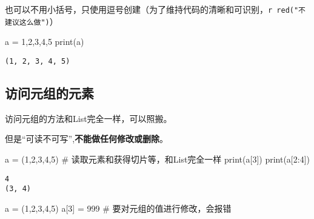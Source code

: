 \documentclass[
  letterpaper,
  DIV=11,
  numbers=noendperiod]{scrreprt}
\newenvironment{Shaded}{\begin{snugshade}}{\end{snugshade}}
\newcommand{\BuiltInTok}[1]{\textcolor[rgb]{0.00,0.23,0.31}{#1}}
\newcommand{\CommentTok}[1]{\textcolor[rgb]{0.37,0.37,0.37}{#1}}
\newcommand{\DecValTok}[1]{\textcolor[rgb]{0.68,0.00,0.00}{#1}}
\newcommand{\NormalTok}[1]{\textcolor[rgb]{0.00,0.23,0.31}{#1}}
\newcommand{\OperatorTok}[1]{\textcolor[rgb]{0.37,0.37,0.37}{#1}}
\begin{document}
也可以不用小括号，只使用逗号创建（为了维持代码的清晰和可识别，\texttt{r\ red("不建议这么做")}）

\begin{Shaded}
\begin{Highlighting}[]
\NormalTok{a }\OperatorTok{=} \DecValTok{1}\NormalTok{,}\DecValTok{2}\NormalTok{,}\DecValTok{3}\NormalTok{,}\DecValTok{4}\NormalTok{,}\DecValTok{5}
\BuiltInTok{print}\NormalTok{(a)}
\end{Highlighting}
\end{Shaded}

\begin{verbatim}
(1, 2, 3, 4, 5)
\end{verbatim}

\hypertarget{ux8bbfux95eeux5143ux7ec4ux7684ux5143ux7d20}{%
\subsection{访问元组的元素}\label{ux8bbfux95eeux5143ux7ec4ux7684ux5143ux7d20}}

访问元组的方法和List完全一样，可以照搬。

但是``可读不可写'',\textbf{不能做任何修改或删除}。

\begin{Shaded}
\begin{Highlighting}[]
\NormalTok{a }\OperatorTok{=}\NormalTok{ (}\DecValTok{1}\NormalTok{,}\DecValTok{2}\NormalTok{,}\DecValTok{3}\NormalTok{,}\DecValTok{4}\NormalTok{,}\DecValTok{5}\NormalTok{) }\CommentTok{\# 读取元素和获得切片等，和List完全一样}
\BuiltInTok{print}\NormalTok{(a[}\DecValTok{3}\NormalTok{])}
\BuiltInTok{print}\NormalTok{(a[}\DecValTok{2}\NormalTok{:}\DecValTok{4}\NormalTok{]) }
\end{Highlighting}
\end{Shaded}

\begin{verbatim}
4
(3, 4)
\end{verbatim}

\begin{Shaded}
\begin{Highlighting}[]
\NormalTok{a }\OperatorTok{=}\NormalTok{ (}\DecValTok{1}\NormalTok{,}\DecValTok{2}\NormalTok{,}\DecValTok{3}\NormalTok{,}\DecValTok{4}\NormalTok{,}\DecValTok{5}\NormalTok{) }
\NormalTok{a[}\DecValTok{3}\NormalTok{] }\OperatorTok{=} \DecValTok{999} \CommentTok{\# 要对元组的值进行修改，会报错}
\end{Highlighting}
\end{Shaded}
\end{document}
